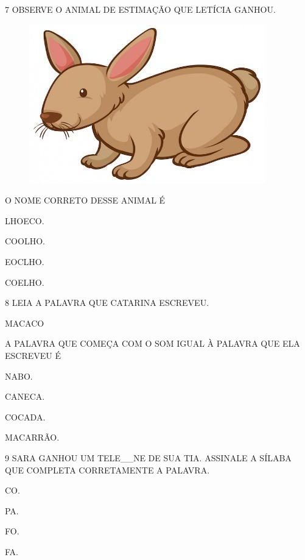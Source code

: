 \num{7} OBSERVE O ANIMAL DE ESTIMAÇÃO QUE LETÍCIA GANHOU.

\begin{figure}[H]
\centering
\includegraphics[width=.4\textwidth]{media/image246.jpg}
\end{figure}

O NOME CORRETO DESSE ANIMAL É

\begin{escolha}
\item LHOECO.

\item COOLHO.

\item EOCLHO.

\item COELHO.
\end{escolha}

\num{8} LEIA A PALAVRA QUE CATARINA ESCREVEU.

\begin{myquote}
\centering\large{MACACO}
\end{myquote}

A PALAVRA QUE COMEÇA COM O SOM IGUAL À PALAVRA QUE ELA ESCREVEU É 

\begin{multicols}{2}
\begin{escolha}
\item NABO.

\item CANECA.

\item COCADA.

\item MACARRÃO.
\end{escolha}
\end{multicols}

\num{9} SARA GANHOU UM TELE\_\_NE DE SUA TIA. ASSINALE A SÍLABA QUE COMPLETA CORRETAMENTE A PALAVRA.

\begin{multicols}{2}
\begin{escolha}
\item CO.

\item PA.

\item FO.

\item FA.
\end{escolha}
\end{multicols}

